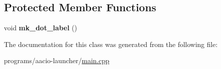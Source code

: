 \subsection*{Protected Member Functions}
\begin{DoxyCompactItemize}
\item 
\mbox{\label{classhost__def_ac6aba69a59a5f446f68e1498e43e6111}} 
void {\bfseries mk\+\_\+dot\+\_\+label} ()
\end{DoxyCompactItemize}


The documentation for this class was generated from the following file\+:\begin{DoxyCompactItemize}
\item 
programs/aacio-\/launcher/\mbox{\hyperlink{programs_2aacio-launcher_2main_8cpp}{main.\+cpp}}\end{DoxyCompactItemize}
